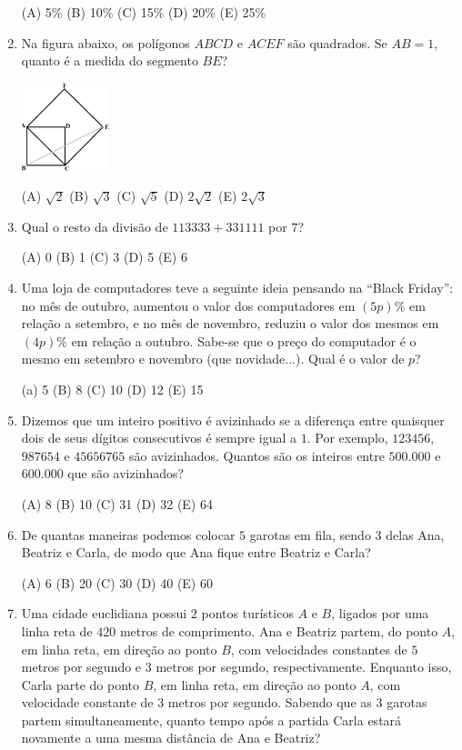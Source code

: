 \documentclass[12pt]{article}
\begin{document}
\begin{enumerate}[label=\textbf{{\arabic*.}}]
(A) 5\% (B) 10\% (C) 15\% (D) 20\% (E) 25\%

\item Na figura abaixo, os polígonos $ABCD$ e $ACEF$ são quadrados. Se $AB=1$, quanto é a medida do segmento $BE$?

  \begin{center}
  \includegraphics[width=0.2\textwidth]{second.png}
\end{center}


(A) $\sqrt{2}$ (B) $\sqrt{3}$ (C) $\sqrt{5}$ (D) $2\sqrt{2}$ (E) $2\sqrt{3}$

\item Qual o resto da divisão de $113333 + 331111$ por $7$?

(A) 0 (B) 1 (C) 3 (D) 5 (E) 6

\item Uma loja de computadores teve a seguinte ideia pensando na “Black Friday”: no mês de outubro, aumentou o valor dos computadores em $(5p)\%$ em relação a setembro, e no mês de novembro, reduziu o valor dos mesmos em $(4p)\%$ em relação a outubro. Sabe-se que o preço do computador é o mesmo em setembro e novembro (que novidade...). Qual é o valor de $p$?

(a) 5 (B) 8 (C) 10 (D) 12 (E) 15

\item Dizemos que um inteiro positivo é avizinhado se a diferença entre quaisquer dois de seus dígitos consecutivos é sempre igual a $1$. Por exemplo, $123456$, $987654$ e $45656765$ são avizinhados. Quantos são os inteiros entre $500{.}000$ e $600{.}000$ que são avizinhados?

(A) 8 (B) 10 (C) 31 (D) 32 (E) 64

\item De quantas maneiras podemos colocar $5$ garotas em fila, sendo $3$ delas Ana, Beatriz e Carla, de modo que Ana fique entre Beatriz e Carla?

(A) 6 (B) 20 (C) 30 (D) 40 (E) 60

\item Uma cidade euclidiana possui $2$ pontos turísticos $A$ e $B$, ligados por uma linha reta de $420$ metros de comprimento. Ana e Beatriz partem, do ponto $A$, em linha reta, em direção ao ponto $B$, com velocidades constantes de $5$ metros por segundo e $3$ metros por segundo, respectivamente. Enquanto isso, Carla parte do ponto $B$, em linha reta, em direção ao ponto $A$, com velocidade constante de $3$ metros por segundo. Sabendo que as $3$ garotas partem simultaneamente, quanto tempo após a partida Carla estará novamente a uma mesma distância de Ana e Beatriz?


\end{enumerate}
\end{document}
